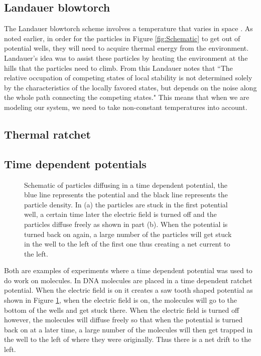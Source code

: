 \subsection{Landauer blowtorch}
The Landauer blowtorch scheme involves a temperature that varies in space \cite{Landauer1988}. As noted earlier, in order for the particles in Figure \ref{fig:Schematic} to get out of potential wells, they will need to acquire thermal energy from the environment. Landauer's idea was to assist these particles by heating the environment at the hills that the particles need to climb. From this Landauer notes that \cite{Landauer1988} ``The relative occupation of competing states of local stability is not determined solely by the characteristics of the locally favored states, but depends on the noise along the whole path connecting the competing states." This means that when we are modeling our system, we need to take non-constant temperatures into account.

\subsection{Thermal ratchet}
\cite{Pedro2014}

\subsection{Time dependent potentials}

\begin{figure}[tb]
	\centering
\quad
\caption{Schematic of particles diffusing in a time dependent potential, the blue line represents the potential and the black line represents the particle density. In (a) the particles are stuck in the first potential well, a certain time later the electric field is turned off and the particles diffuse freely as shown in part (b). When the potential is turned back on again, a large number of the particles will get stuck in the well to the left of the first one thus creating a net current to the left.}
\label{fig:TimeDependent}
\end{figure}

Both \cite{BlickleBechinger2011} \cite{JoelBader1999} are examples of experiments where a time dependent potential was used to do work on molecules. In \cite{JoelBader1999} DNA molecules are placed in a time dependent ratchet potential. When the electric field is on it creates a saw tooth shaped potential as shown in Figure \ref{fig:TimeDependent}, when the electric field is on, the molecules will go to the bottom of the wells and get stuck there. When the electric field is turned off however, the molecules will diffuse freely so that when the potential is turned back on at a later time, a large number of the molecules will then get trapped in the well to the left of where they were originally. Thus there is a net drift to the left.

